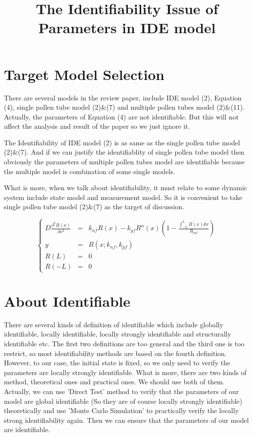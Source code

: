 \documentclass[12pt]{extarticle}
\title{The Identifiability Issue of Parameters in IDE model}
\begin{document}
\maketitle
	
\section{Target Model Selection}
\label{sect:TargetModelSelection}

There are several models in the review paper, include IDE model (2), Equation (4), single pollen tube model (2)\&(7) and multiple pollen tubes model (2)\&(11). Actually, the parameters of Equation (4) are not identifiable. But this will not affect the analysis and result of the paper so we just ignore it.

The Identifiability of IDE model (2) is as same as the single pollen tube model (2)\&(7). And if we can justify the identifiablity of single pollen tube model then obviously the parameters of multiple pollen tubes model are identifiable because the multiple model is combination of some single models.

What is more, when we talk about identifiability, it must relate to some dynamic system include state model and measurement model. So it is convenient to take single pollen tube model (2)\&(7) as the target of discussion. 

\begin{equation*}
\left\{
\begin{array}{rcl}
D\frac{{\partial}^{2}R(x)}{{\partial}x^{2}} & = & k_{nf}R(x)-k_{pf}R^{\alpha}(x)\left(1-\frac{\int_{-L}^{L}R(x)dx}{R_{tot}}\right) \\
y & = & R(x;k_{nf},k_{pf}) \\
R(L) & = & 0 \\
R(-L) & = & 0

\end{array} \right.
\end{equation*}

\section{About Identifiable}
\label{sect:AboutIdentifiable}

There are several kinds of definition of identifiable which include globally identifiable, locally identifiable, locally strongly identifiable and structurally identifiable etc. The first two definitions are too general and the third one is too restrict, so most identifiability methods are based on the fourth definition. However, to our case, the initial state is fixed, so we only need to verify the parameters are locally strongly identifiable. What is more, there are two kinds of method, theoretical ones and practical ones. We should use both of them. Actually, we can use 'Direct Test' method to verify that the parameters of our model are global identifiable (So they are of course locally strongly identifiable) theoretically and use 'Monte Carlo Simulation' to practically verify the locally strong identifiability again. Then we can ensure that the parameters of our model are identifiable. 
\end{document}
